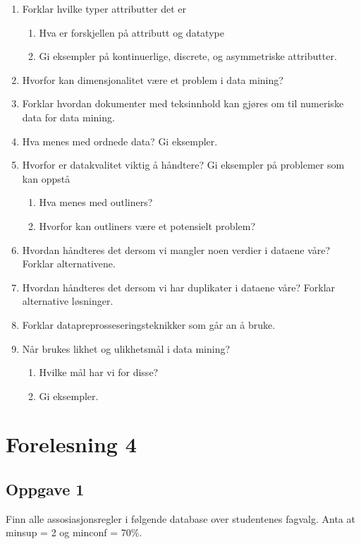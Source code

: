 		\begin{enumerate}
			\item Forklar hvilke typer attributter det er
				\begin{enumerate}
					\item Hva er forskjellen på attributt og datatype
					\item Gi eksempler på kontinuerlige, discrete, og asymmetriske attributter.
				\end{enumerate}
			\item Hvorfor kan dimensjonalitet være et problem i data mining?
			\item Forklar hvordan dokumenter med teksinnhold kan gjøres om til numeriske data for 
			data mining.
			\item Hva menes med ordnede data? Gi eksempler.
			\item Hvorfor er datakvalitet viktig å håndtere? Gi eksempler på problemer som kan 
			oppstå 
				\begin{enumerate}
					\item Hva menes med outliners?
					\item Hvorfor kan outliners være et potensielt problem?
				\end{enumerate}
			\item Hvordan håndteres det dersom vi mangler noen verdier i  dataene våre?
			Forklar alternativene.
			\item Hvordan håndteres det dersom vi har duplikater i dataene våre? Forklar alternative løsninger.
			\item Forklar datapreprosseseringsteknikker som går an å bruke.
			\item Når brukes likhet og ulikhetsmål i data mining?
				\begin{enumerate}
					\item Hvilke mål har vi for disse?
					\item Gi eksempler.
				\end{enumerate}
		\end{enumerate}

	\section{Forelesning 4}
		
		\subsection*{Oppgave 1}

			Finn alle assosiasjonsregler i følgende database over studentenes fagvalg.
			Anta at minsup = 2 og minconf = 70\%.

